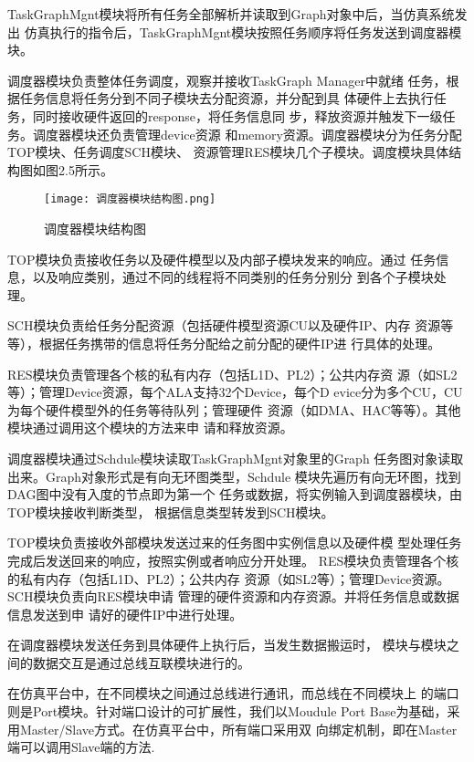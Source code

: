 TaskGraphMgnt模块将所有任务全部解析并读取到Graph对象中后，当仿真系统发出
仿真执行的指令后，TaskGraphMgnt模块按照任务顺序将任务发送到调度器模块。

调度器模块负责整体任务调度，观察并接收TaskGraph Manager中就绪
任务，根据任务信息将任务分到不同子模块去分配资源，并分配到具
体硬件上去执行任务，同时接收硬件返回的response，将任务信息同
步，释放资源并触发下一级任务。调度器模块还负责管理device资源
和memory资源。调度器模块分为任务分配TOP模块、任务调度SCH模块、
资源管理RES模块几个子模块。调度模块具体结构图如图2.5所示。
  
\begin{figure}[h]
    \centering
    \texttt{[image: 调度器模块结构图.png]}
    \caption{调度器模块结构图}
    \label{fig:badge}
\end{figure}
  
TOP模块负责接收任务以及硬件模型以及内部子模块发来的响应。通过
任务信息，以及响应类别，通过不同的线程将不同类别的任务分别分
到各个子模块处理。
  
SCH模块负责给任务分配资源（包括硬件模型资源CU以及硬件IP、内存
资源等等），根据任务携带的信息将任务分配给之前分配的硬件IP进
行具体的处理。
  
RES模块负责管理各个核的私有内存（包括L1D、PL2）；公共内存资
源（如SL2等）；管理Device资源，每个ALA支持32个Device，每个D
evice分为多个CU，CU为每个硬件模型外的任务等待队列；管理硬件
资源（如DMA、HAC等等）。其他模块通过调用这个模块的方法来申
请和释放资源。

调度器模块通过Schdule模块读取TaskGraphMgnt对象里的Graph
任务图对象读取出来。Graph对象形式是有向无环图类型，Schdule
模块先遍历有向无环图，找到DAG图中没有入度的节点即为第一个
任务或数据，将实例输入到调度器模块，由TOP模块接收判断类型，
根据信息类型转发到SCH模块。

TOP模块负责接收外部模块发送过来的任务图中实例信息以及硬件模
型处理任务完成后发送回来的响应，按照实例或者响应分开处理。
RES模块负责管理各个核的私有内存（包括L1D、PL2）；公共内存
资源（如SL2等）；管理Device资源。SCH模块负责向RES模块申请
管理的硬件资源和内存资源。并将任务信息或数据信息发送到申
请好的硬件IP中进行处理。

在调度器模块发送任务到具体硬件上执行后，当发生数据搬运时，
模块与模块之间的数据交互是通过总线互联模块进行的。

在仿真平台中，在不同模块之间通过总线进行通讯，而总线在不同模块上
的端口则是Port模块。针对端口设计的可扩展性，我们以Moudule Port 
Base为基础，采用Master/Slave方式。在仿真平台中，所有端口采用双
向绑定机制，即在Master端可以调用Slave端的方法.

